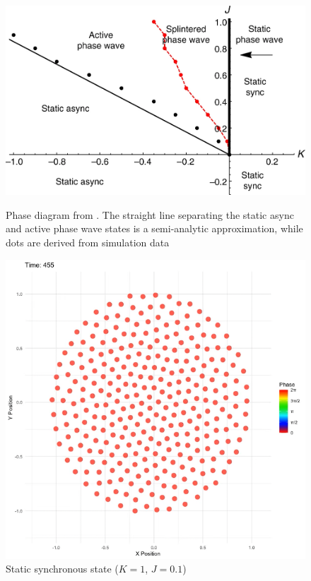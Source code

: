 \begin{figure}[h]
 \centering
    \begin{minipage}{0.55\textwidth}
        \centering
        \includegraphics[width=\textwidth]{images/task20/phase_space.png}
        \caption{Phase diagram from \cite{O_Keeffe_2017}.  The straight line separating the static async and active phase wave states is a semi-analytic approximation, while dots are derived from simulation data}
        \label{fig:phase_space}
    \end{minipage}
    \hfill
    \begin{minipage}{0.4\textwidth}
        \centering
        \includegraphics[width=\textwidth]{images/task20/static_sync.png}
        \caption{Static synchronous state \newline ($K=1$, $J=0.1$)}
        \label{fig:static_sync}
    \end{minipage}
\end{figure}






